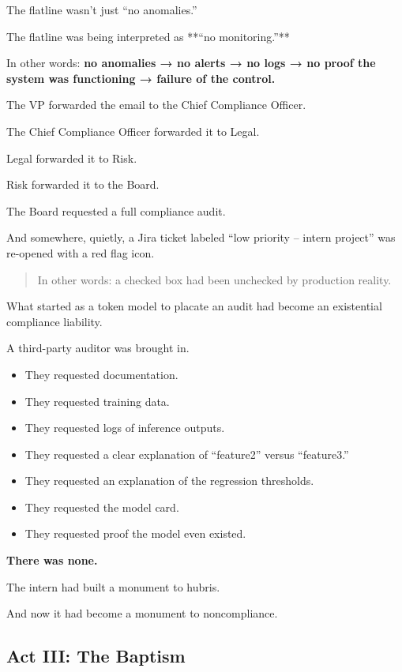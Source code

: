 The flatline wasn’t just “no anomalies.”

The flatline was being interpreted as **“no monitoring.”**

In other words:  \textbf{no anomalies → no alerts → no logs → no proof the system was functioning → failure of the control.}

The VP forwarded the email to the Chief Compliance Officer.

The Chief Compliance Officer forwarded it to Legal.

Legal forwarded it to Risk.

Risk forwarded it to the Board.

The Board requested a full compliance audit.

And somewhere, quietly, a Jira ticket labeled “low priority – intern project” was re-opened with a red flag icon.


\begin{quote}
In other words: a checked box had been unchecked by production reality.
\end{quote}

What started as a token model to placate an audit had become an existential compliance liability.

A third-party auditor was brought in.

\begin{itemize}

    \item They requested documentation.
    \item They requested training data.
    \item They requested logs of inference outputs.
    \item They requested a clear explanation of “feature2” versus “feature3.”
    \item They requested an explanation of the regression thresholds.
    \item They requested the model card.
    \item They requested proof the model even existed.

\end{itemize}

\textbf{There was none.}

The intern had built a monument to hubris.

And now it had become a monument to noncompliance.
    



\subsection{Act III: The Baptism}

